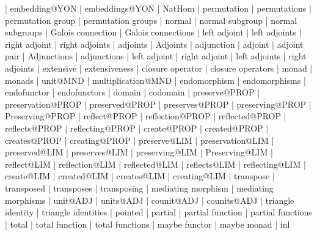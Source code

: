     |   embedding@YON
    |   embeddings@YON
    |   NatHom
    |   permutation
    |   permutations
    |   permutation group
    |   permutation groups
    |   normal
    |   normal subgroup
    |   normal subgroups
    |   Galois connection
    |   Galois connections
    |   left adjoint
    |   left adjoints
    |   right adjoint
    |   right adjoints
    |   adjoints
    |   Adjoints
    |   adjunction
    |   adjoint
    |   adjoint pair
    |   Adjunctions
    |   adjunctions
    |   left adjoint
    |   right adjoint
    |   left adjoints
    |   right adjoints
    |   extensive
    |   extensiveness
    |   closure operator
    |   closure operators
    |   monad
    |   monads
    |   unit@MND
    |   multiplication@MND
    |   endomorphism
    |   endomorphisms
    |   endofunctor
    |   endofunctors
    |   domain
    |   codomain
    |   preserve@PROP
    |   preservation@PROP
    |   preserved@PROP
    |   preserves@PROP
    |   preserving@PROP
    |   Preserving@PROP
    |   reflect@PROP
    |   reflection@PROP
    |   reflected@PROP
    |   reflects@PROP
    |   reflecting@PROP
    |   create@PROP
    |   created@PROP
    |   creates@PROP
    |   creating@PROP
    |   preserve@LIM
    |   preservation@LIM
    |   preserved@LIM
    |   preserves@LIM
    |   preserving@LIM
    |   Preserving@LIM
    |   reflect@LIM
    |   reflection@LIM
    |   reflected@LIM
    |   reflects@LIM
    |   reflecting@LIM
    |   create@LIM
    |   created@LIM
    |   creates@LIM
    |   creating@LIM
    |   transpose
    |   transposed
    |   transposes
    |   transposing
    |   mediating morphism
    |   mediating morphisms
    |   unit@ADJ
    |   units@ADJ  
    |   counit@ADJ
    |   counits@ADJ
    |   triangle identity
    |   triangle identities
    |   pointed
    |   partial
    |   partial function
    |   partial functions
    |   total
    |   total function
    |   total functions
    |   maybe functor
    |   maybe monad
    |   inl
